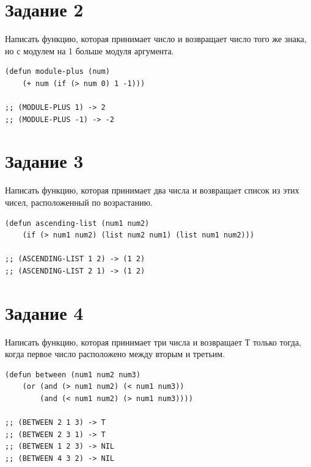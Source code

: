 \documentclass[a4paper,14pt, unknownkeysallowed]{extreport}
\begin{document}
\section{Задание 2}

Написать функцию, которая принимает число и возвращает число того же знака, но с модулем на 1 больше модуля аргумента.

\begin{center}
\captionsetup{justification=raggedright,singlelinecheck=off}
\begin{lstlisting}[label=lst:parallel_processing,caption=Решение задания 2]
(defun module-plus (num)
    (+ num (if (> num 0) 1 -1)))

;; (MODULE-PLUS 1) -> 2
;; (MODULE-PLUS -1) -> -2
\end{lstlisting}
\end{center}

\section{Задание 3}

Написать функцию, которая принимает два числа и возвращает список из этих чисел, расположенный по возрастанию.

\begin{center}
\captionsetup{justification=raggedright,singlelinecheck=off}
\begin{lstlisting}[label=lst:parallel_processing,caption=Решение задания 3]
(defun ascending-list (num1 num2)
    (if (> num1 num2) (list num2 num1) (list num1 num2)))

;; (ASCENDING-LIST 1 2) -> (1 2)
;; (ASCENDING-LIST 2 1) -> (1 2)
\end{lstlisting}
\end{center}

\section{Задание 4}

Написать функцию, которая принимает три числа и возвращает Т только тогда, когда первое число расположено между вторым и третьим.

\begin{center}
\captionsetup{justification=raggedright,singlelinecheck=off}
\begin{lstlisting}[label=lst:parallel_processing,caption=Решение задания 4]
(defun between (num1 num2 num3)
    (or (and (> num1 num2) (< num1 num3))
        (and (< num1 num2) (> num1 num3))))

;; (BETWEEN 2 1 3) -> T
;; (BETWEEN 2 3 1) -> T
;; (BETWEEN 1 2 3) -> NIL
;; (BETWEEN 4 3 2) -> NIL
\end{lstlisting}
\end{center}
\end{document}
